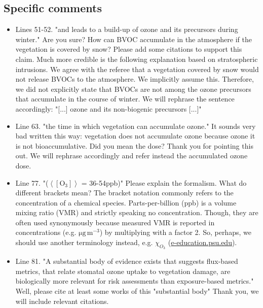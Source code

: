 \documentclass{scrartcl}
\begin{document}
\subsection*{Specific comments} 
\begin{itemize}
    
\item {\color{blue}Lines 51-52. "and leads to a build-up of ozone and its precursors during winter." Are you sure? How can BVOC accumulate in the atmosphere if the vegetation is covered by snow? Please add some citations to support this claim. Much more credible is the following explanation based on stratospheric intrusions.}
We agree with the referee that a vegetation covered by snow would not release BVOCs to the atmosphere. We implicitly assume this. Therefore, we did not explicitly state that BVOCs are not among the ozone precursors that accumulate in the course of winter. We will rephrase the sentence accordingly: "[...] ozone and its non-biogenic precursors [...]"

\item {\color{blue}Line 63. "the time in which vegetation can accumulate ozone." 
It sounds very bad written this way: vegetation does not accumulate ozone because ozone it is not bioaccumulative. Did you mean the dose?}
Thank you for pointing this out. We will rephrase accordingly and refer instead the accumulated ozone dose.

\item {\color{blue}Line 77. "($\left<[\mathrm{O_3}]\right>$ = 36-54ppb)" Please explain the formalism. What do different brackets mean?} The bracket notation commonly refers to the concentration of a chemical species. Parts-per-billion (ppb) is a volume mixing ratio (VMR) and strictly speaking no concentration. Though, they are often used synonymously because measured VMR is reported in concentrations (e.g. $\mathrm{\mu g\,m^{-3}}$) by multiplying with a factor 2. So, perhaps, we should use another terminology instead, e.g. $\chi_{O_3}$ (\href{https://www.e-education.psu.edu/meteo300/node/534}{e-education.psu.edu}).

\item {\color{blue}Line 81. "A substantial body of evidence exists that suggests flux-based metrics, that relate stomatal ozone uptake to vegetation damage, are biologically more relevant for risk assessments than exposure-based metrics." 
Well, please cite at least some works of this "substantial body"} Thank you, we will include relevant citations.


\end{itemize}
\end{document}
